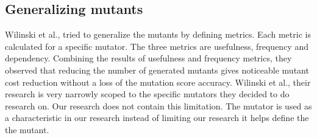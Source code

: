 \documentclass[../main]{subfiles}
\begin{document}
\subsection{Generalizing mutants}
Wilinski et al., tried to generalize the mutants by defining metrics.
Each metric is calculated for a specific mutator.
The three metrics are usefulness, frequency and dependency.
Combining the results of usefulness and frequency metrics, they observed that reducing the number of generated mutants gives noticeable mutant cost reduction without a loss of the mutation score accuracy.
Wilinski et al., their research is very narrowly scoped to the specific mutators they decided to do research on.
Our research does not contain this limitation.
The mutator is used as a characteristic in our research instead of limiting our research it helps define the the mutant.
\end{document}
